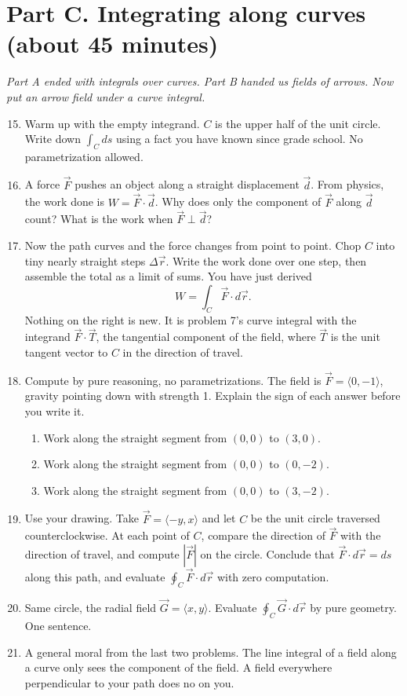 \documentclass[12pt]{article}
\newcommand{\flow}[1]{\par\noindent\textit{#1}\par\vspace{1mm}}
\begin{document}
\newpage
\section*{Part C. Integrating along curves (about 45 minutes)}

\flow{Part A ended with integrals over curves. Part B handed us fields of arrows. Now put an arrow field under a curve integral.}

\begin{enumerate}\setcounter{enumi}{14}
  \item Warm up with the empty integrand. $C$ is the upper half of the unit circle. Write down $\displaystyle\int_C ds$ using a fact you have known since grade school. No parametrization allowed.
  \item A force $\vec F$ pushes an object along a straight displacement $\vec d$. From physics, the work done is $W = \vec F \cdot \vec d$. Why does only the component of $\vec F$ along $\vec d$ count? What is the work when $\vec F \perp \vec d$?
  \item Now the path curves and the force changes from point to point. Chop $C$ into tiny nearly straight steps $\Delta\vec r$. Write the work done over one step, then assemble the total as a limit of sums. You have just derived
  $$W = \int_C \vec F \cdot d\vec r.$$
  Nothing on the right is new. It is problem 7's curve integral with the integrand $\vec F \cdot \vec T$, the tangential component of the field, where $\vec T$ is the unit tangent vector to $C$ in the direction of travel.
  \item Compute by pure reasoning, no parametrizations. The field is $\vec F = \langle 0, -1 \rangle$, gravity pointing down with strength 1. Explain the sign of each answer before you write it.
  \begin{enumerate}
    \item Work along the straight segment from $(0,0)$ to $(3,0)$.
    \item Work along the straight segment from $(0,0)$ to $(0,-2)$.
    \item Work along the straight segment from $(0,0)$ to $(3,-2)$.
  \end{enumerate}
  \item Use your drawing. Take $\vec F = \langle -y, x \rangle$ and let $C$ be the unit circle traversed counterclockwise. At each point of $C$, compare the direction of $\vec F$ with the direction of travel, and compute $|\vec F|$ on the circle. Conclude that $\vec F \cdot d\vec r = ds$ along this path, and evaluate $\displaystyle\oint_C \vec F \cdot d\vec r$ with zero computation.
  \item Same circle, the radial field $\vec G = \langle x, y \rangle$. Evaluate $\displaystyle\oint_C \vec G \cdot d\vec r$ by pure geometry. One sentence.
  \item A general moral from the last two problems. The line integral of a field along a curve only sees the \underline{\hspace{2cm}} component of the field. A field everywhere perpendicular to your path does no \underline{\hspace{2cm}} on you.
\end{enumerate}
\end{document}
